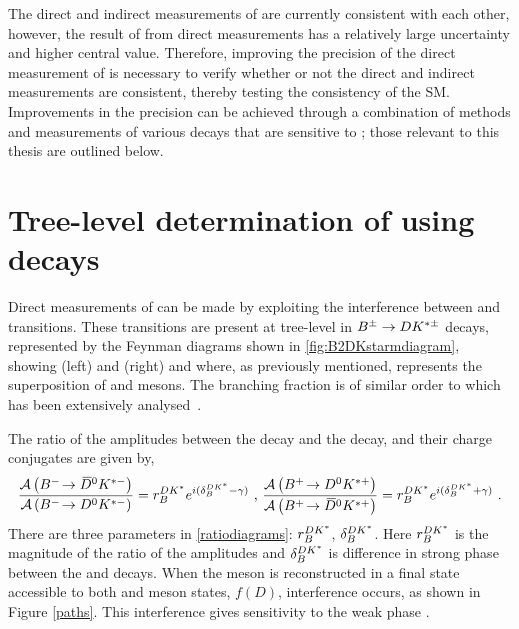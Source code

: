 The direct and indirect measurements of \Pgamma are currently consistent with each other, however, the result of \Pgamma from direct measurements has a relatively large uncertainty and higher central value. Therefore, improving the precision of the direct measurement of \Pgamma is necessary to verify whether or not the direct and indirect measurements are consistent, thereby testing the consistency of the SM. Improvements in the precision can be achieved through a combination of methods and measurements of various \B decays that are sensitive to \Pgamma; those relevant to this thesis are outlined below.

\section{Tree-level determination of \Pgamma using  decays}
\label{sec:theory:gamma}

Direct measurements of \Pgamma can be made by exploiting the interference between \decay{\bquark}{\cquark\uquarkbar\squark} and \decay{\bquark}{\uquark\cquarkbar\squark} transitions. These transitions are present at tree-level in ${{B}^\pm} \rightarrow {\ensuremath{D}}{\ensuremath{K}}^{*\pm}$ decays, represented by the Feynman diagrams shown in \fig\ref{fig:B2DKstarmdiagram}, showing \decay{\Bm}{\Dz\Kstarm} (left) and \decay{\Bm}{\Dzb\Kstarm} (right) and where, as previously mentioned, \D represents the superposition of \Dz and \Dzb mesons. The branching
fraction is of similar order to \decay{\Bm}{\Dzb\Km} which has been extensively analysed~\cite{LHCb-PAPER-2016-003,LHCb-PAPER-2014-041,LHCb-PAPER-2015-014}.


The ratio of the amplitudes between the \decay{\Bm}{\Dzb\Kstarm} decay and the \decay{\Bm}{\Dz\Kstarm} decay, and their charge conjugates are given by,
\begin{equation}
\frac{\mathcal{A}\left({{{B}^-}}\!\rightarrow {\ensuremath{{\kern 0.2em\overline{\kern -0.2em D}{}}{}^0}}{\ensuremath{{K}^{*-}}}\right)}{\mathcal{A}\left({{{B}^-}}\!\rightarrow {\ensuremath{{D}^0}}{\ensuremath{{K}^{*-}}}\right)} = r_B^{DK^*} e^{i(\delta_B^{DK^*} - \gamma)} \text{ , }
\frac{\mathcal{A}\left({{{B}^+}}\!\rightarrow {\ensuremath{{D}^0}}{\ensuremath{{K}^{*+}}}\right)}{\mathcal{A}\left({{{B}^+}}\!\rightarrow {\ensuremath{{\kern 0.2em\overline{\kern -0.2em D}{}}{}^0}}{\ensuremath{{K}^{*+}}}\right)} = r_B^{DK^*} e^{i(\delta_B^{DK^*} + \gamma)} \text{ .}
\label{ratiodiagrams}
\end{equation}
There are three parameters in \eqn\ref{ratiodiagrams}: $r_B^{DK^*}$, $\delta_B^{DK^*}$. Here $r_B^{DK^*}$ is the magnitude of the ratio of the amplitudes and $\delta_B^{DK^*}$ is difference in strong phase between the \decay{\Bm}{\Dz\Kstarm} and \decay{\Bm}{\Dzb\Kstarm} decays. When the \D meson is reconstructed in a final state accessible to both \Dz and \Dzb meson states, $f(D)$, interference occurs, as shown in Figure \ref{paths}. This interference gives sensitivity to the weak phase \Pgamma.


